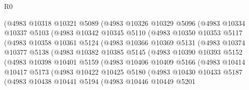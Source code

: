 \begin{lexlean}{R0}
\begin{coremodule}
              (@4983
                @10318
                @10321
                @5089
                (@4983
                  @10326
                  @10329
                  @5096
                  (@4983
                    @10334
                    @10337
                    @5103
                    (@4983
                      @10342
                      @10345
                      @5110
                      (@4983
                        @10350
                        @10353
                        @5117
                        (@4983
                          @10358
                          @10361
                          @5124
                          (@4983
                            @10366
                            @10369
                            @5131
                            (@4983
                              @10374
                              @10377
                              @5138
                              (@4983
                                @10382
                                @10385
                                @5145
                                (@4983
                                  @10390
                                  @10393
                                  @5152
                                  (@4983
                                    @10398
                                    @10401
                                    @5159
                                    (@4983
                                      @10406
                                      @10409
                                      @5166
                                      (@4983
                                        @10414
                                        @10417
                                        @5173
                                        (@4983
                                          @10422
                                          @10425
                                          @5180
                                          (@4983
                                            @10430
                                            @10433
                                            @5187
                                            (@4983
                                              @10438
                                              @10441
                                              @5194
                                              (@4983
                                                @10446
                                                @10449
                                                @5201

\end{coremodule}
\end{lexlean}
